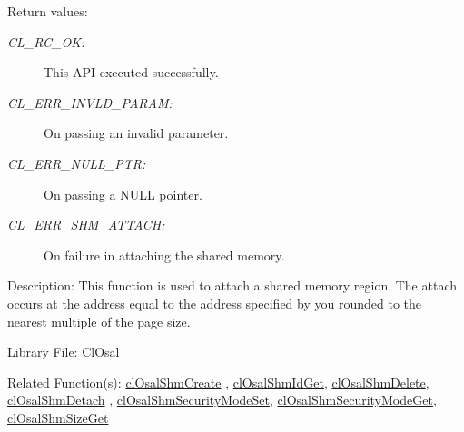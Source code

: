 \begin{Desc}
\item[Return values:]
\begin{description}
\item[{\em CL\_\-RC\_\-OK:}]This API executed successfully. \item[{\em CL\_\-ERR\_\-INVLD\_\-PARAM:}]On passing an invalid parameter. \item[{\em CL\_\-ERR\_\-NULL\_\-PTR:}]On passing a NULL pointer. \item[{\em CL\_\-ERR\_\-SHM\_\-ATTACH:}]On failure in attaching the shared memory.\end{description}
\end{Desc}
\begin{Desc}
\item[Description:]This function is used to attach a shared memory region. The attach occurs at the address equal to the address specified by you rounded to the nearest multiple of the page size.\end{Desc}
\begin{Desc}
\item[Library File:]Cl\-Osal\end{Desc}
\begin{Desc}
\item[Related Function(s):]\hyperlink{pageosal145}{cl\-Osal\-Shm\-Create} , \hyperlink{pageosal146}{cl\-Osal\-Shm\-Id\-Get}, 
\hyperlink{pageosal147}{cl\-Osal\-Shm\-Delete}, \hyperlink{pageosal149}{cl\-Osal\-Shm\-Detach} , 
\hyperlink{pageosal150}{cl\-Osal\-Shm\-Security\-Mode\-Set}, \hyperlink{pageosal151}{cl\-Osal\-Shm\-Security\-Mode\-Get}, 
\hyperlink{pageosal152}{cl\-Osal\-Shm\-Size\-Get} \end{Desc}

\newpage
